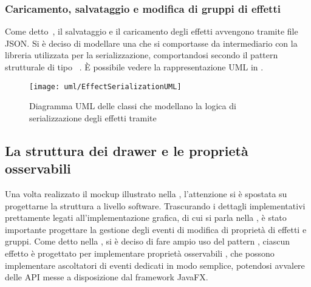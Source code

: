             \subsubsection{Caricamento, salvataggio e modifica di gruppi di effetti}\label{subsubsec:serializzazione}
                Come detto~, il salvataggio e il caricamento degli effetti avvengono tramite file JSON.
                Si è deciso di modellare una  che si comportasse da intermediario con la libreria utilizzata per la serializzazione, comportandosi secondo il pattern strutturale di tipo ~\cite{designPattern}.
                È possibile vedere la rappresentazione UML in .

                \begin{figure}[htbp]
                    \centering
                    \texttt{[image: uml/EffectSerializationUML]}
                    \caption{Diagramma UML delle classi che modellano la logica di serializzazione degli effetti tramite }
                    \label{fig:serial}
                \end{figure}

        \subsection{La struttura dei drawer e le proprietà osservabili}\label{subsec:drawer}
            Una volta realizzato il mockup illustrato nella , l'attenzione si è spostata su progettarne la struttura a livello software.
            Trascurando i dettagli implementativi prettamente legati all'implementazione grafica, di cui si parla nella , è stato importante progettare la gestione degli eventi di modifica di proprietà di effetti e gruppi.
            Come detto nella , si è deciso di fare ampio uso del pattern , ciascun effetto è progettato per implementare proprietà osservabili%
            , che possono implementare ascoltatori di eventi dedicati in modo semplice, potendosi avvalere delle API messe a disposizione dal framework JavaFX.


